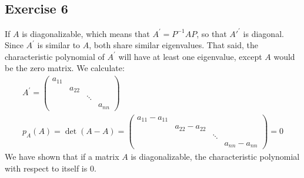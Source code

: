  
\subsection{Exercise 6}
If $A$ is diagonalizable, which means that $A^{'} = P^{-1}AP$, so that $A'^{'}$ is diagonal. 
Since $A^{'}$ is similar to $A$, both share similar eigenvalues. That said, the characteristic polynomial of $A^{'}$ will have at least one eigenvalue, except $A$ would be the zero matrix.
We calculate:
\begin{gather*}
A^{'} = \left( \begin{array}{cccc}
a_{11}& & &  \\
& a_{22}& &  \\
& & \ddots&  \\
& & & a_{nn}
\end{array} \right) \\
p_{A}(A) = \det (A - A) =
\left( \begin{array}{cccc}
a_{11}- a_{11}& & &  \\
& a_{22} - a_{22}& &  \\
& & \ddots&  \\
& & & a_{nn} - a_{nn}
\end{array} \right) =
0
\end{gather*}
We have shown that if a matrix $A$ is diagonalizable, the characteristic polynomial with respect to itself is $0$.
